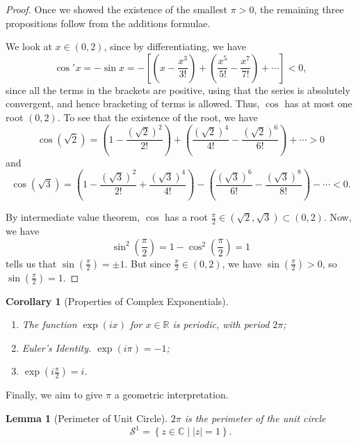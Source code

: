 \documentclass[11pt]{article}
\numberwithin{equation}{section}
\newtheorem{lemma}[theorem]{Lemma}
\newtheorem{corollary}[theorem]{Corollary}
\theoremstyle{definition}
\theoremstyle{remark}
\newcommand{\pqty}[1]{\left(#1\right)}
\newcommand{\bqty}[1]{\left[#1\right]}
\newcommand{\abs}[1]{\left|#1\right|}
\newcommand{\flatfrac}[2]{\frac{#1}{#2}}
\newcommand{\set}[2]{\left\{#1\mid #2\right\}}
\newcommand{\oointv}[2]{(#1,#2)}
\newcommand{\RR}{\mathbb R}
\newcommand{\CC}{\mathbb C}
\begin{document}
\begin{proof}
    Once we showed the existence of the smallest \(\pi > 0\), the remaining three propositions follow from the additions formulae.

    We look at \(x \in \oointv{0}{2}\), since by differentiating, we have
    \[
        \cos' x = - \sin x = - \bqty{\pqty{x - \frac{x^3}{3!}} + \pqty{\frac{x^5}{5!} - \frac{x^7}{7!}} + \cdots} < 0,
    \]
    since all the terms in the brackets are positive, using that the series is absolutely convergent, and hence bracketing of terms is allowed. Thus, \(\cos\) has at most one root \(\oointv{0}{2}\). To see that the existence of the root, we have
    \[
        \cos \pqty{\sqrt{2}} = \pqty{1 - \frac{\pqty{\sqrt{2}}^2}{2!}} + \pqty{\frac{\pqty{\sqrt{2}}^4}{4!} - \frac{\pqty{\sqrt{2}}^6}{6!}} + \cdots > 0
    \]
    and
    \[
        \cos \pqty{\sqrt{3}} = \pqty{1 - \frac{\pqty{\sqrt{3}}^2}{2!} + \frac{\pqty{\sqrt{3}}^4}{4!}} - \pqty{\frac{\pqty{\sqrt{3}}^6}{6!} - \frac{\pqty{\sqrt{3}}^8}{8!}} - \cdots < 0.
    \]
    
    By intermediate value theorem, \(\cos\) has a root \(\flatfrac{\pi}{2} \in \oointv{\sqrt{2}}{\sqrt{3}} \subset \oointv{0}{2}\). Now, we have
    \[
        \sin^2\pqty{\frac{\pi}{2}} = 1 - \cos^2 \pqty{\frac{\pi}{2}} = 1
    \]
    tells us that \(\sin \pqty{\flatfrac{\pi}{2}} = \pm 1\). But since \(\flatfrac{\pi}{2} \in \oointv{0}{2}\), we have \(\sin \pqty{\flatfrac{\pi}{2}} > 0\), so \(\sin \pqty{\flatfrac{\pi}{2}} = 1\).
\end{proof}

\begin{corollary}[Properties of Complex Exponentials]\label{analysis-unit-0233}
    \label{cor:properties-complex-exponentials}%
    \begin{enumerate}
        \item The function \(\exp \pqty{ix}\) for \(x \in \RR\) is periodic, with period \(2 \pi\);
        \item \emph{Euler's Identity}. \(\exp \pqty{i \pi} = -1\);
        \item \(\exp \pqty{i \flatfrac{\pi}{2}} = i\).
    \end{enumerate}
\end{corollary}

Finally, we aim to give \(\pi\) a geometric interpretation.

\begin{lemma}[Perimeter of Unit Circle]\label{analysis-unit-0234}
    \label{lem:perimeter-unit-circle}%
    \(2\pi\) is the perimeter of the unit circle
    \[
        \mathcal{S}^1 = \set{z \in \CC}{\abs{z} = 1}.
    \]
\end{lemma}
\end{document}
